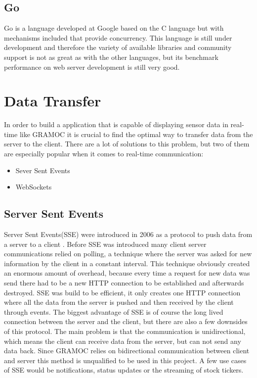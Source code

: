 \subsection{Go}
Go is a language developed at Google based on the C language but with mechanisms included that provide concurrency. This language is still under development and therefore the variety of available libraries and community support is not as great as with the other languages, but its benchmark performance on web server development is still very good.

\section{Data Transfer}
In order to build a application that is capable of displaying sensor data in real-time like GRAMOC it is crucial to find the optimal way to transfer data from the server to the client. There are a lot of solutions to this problem, but two of them are especially popular when it comes to real-time communication:

\begin{itemize}
    \item Sever Sent Events
    \item WebSockets
\end{itemize}

\subsection{Server Sent Events}
\label{subsec:sse}
Server Sent Events(SSE) were introduced in 2006 as a protocol to push data from a server to a client \autocite{sse}. Before SSE was introduced many client server communications relied on polling, a technique where the server was asked for new information by the client in a constant interval. This technique obviously created an enormous amount of overhead, because every time a request for new data was send there had to be a new HTTP connection to be established and afterwards destroyed. SSE was build to be efficient, it only creates one HTTP connection where all the data from the server is pushed and then received by the client through events. The biggest advantage of SSE is of course the long lived connection between the server and the client, but there are also a few downsides of this protocol. The main problem is that the communication is unidirectional, which means the client can receive data from the server, but can not send any data back. Since GRAMOC relies on bidirectional communication between client and server this method is unqualified to be used in this project. A few use cases of SSE would be notifications, status updates or the streaming of stock tickers.

